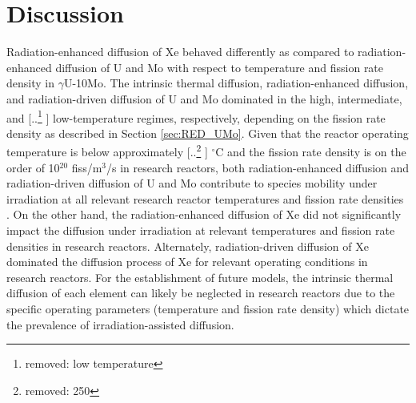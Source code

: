\documentclass[preprint,12pt]{elsarticle}
\providecommand{\DIFadd}[1]{{\protect\color{blue} \sf #1}} %
\providecommand{\DIFdel}[1]{{\protect\color{red} [..\footnote{removed: #1} ]}} %
\providecommand{\DIFaddbegin}{} %
\providecommand{\DIFaddend}{} %
\providecommand{\DIFdelbegin}{} %
\providecommand{\DIFdelend}{} %
\newcommand{\DIFscaledelfig}{0.5}
\newlength{\DIFdelgraphicswidth} %
\newlength{\DIFdelgraphicsheight} %
\newcommand{\DIFaddincludegraphics}[2][]{{\color{blue}\fbox{\DIFOincludegraphics[#1]{#2}}}} %
\newcommand{\DIFdelincludegraphics}[2][]{%
\sbox{\DIFdelgraphicsbox}{\DIFOincludegraphics[#1]{#2}}%
\settoboxwidth{\DIFdelgraphicswidth}{\DIFdelgraphicsbox} %
\settoboxtotalheight{\DIFdelgraphicsheight}{\DIFdelgraphicsbox} %
\scalebox{\DIFscaledelfig}{%
\parbox[b]{\DIFdelgraphicswidth}{\usebox{\DIFdelgraphicsbox}\\[-\baselineskip] \rule{\DIFdelgraphicswidth}{0em}}\llap{\resizebox{\DIFdelgraphicswidth}{\DIFdelgraphicsheight}{%
\setlength{\unitlength}{\DIFdelgraphicswidth}%
\begin{picture}(1,1)%
\thicklines\linethickness{2pt} %
{\color[rgb]{1,0,0}\put(0,0){\framebox(1,1){}}}%
{\color[rgb]{1,0,0}\put(0,0){\line( 1,1){1}}}%
{\color[rgb]{1,0,0}\put(0,1){\line(1,-1){1}}}%
\end{picture}%
}\hspace*{3pt}}} %
} %
\DeclareRobustCommand{\DIFaddbegin}{\DIFOaddbegin \let\includegraphics\DIFaddincludegraphics} %
\DeclareRobustCommand{\DIFaddend}{\DIFOaddend \let\includegraphics\DIFOincludegraphics} %
\DeclareRobustCommand{\DIFdelbegin}{\DIFOdelbegin \let\includegraphics\DIFdelincludegraphics} %
\DeclareRobustCommand{\DIFdelend}{\DIFOaddend \let\includegraphics\DIFOincludegraphics} %
\begin{document}
\FloatBarrier

\section{Discussion}
\label{sec:Discussion}
\indent Radiation-enhanced diffusion of Xe behaved differently as compared to radiation-enhanced diffusion of U and Mo with respect to temperature and fission rate density in $\gamma$U-10Mo. The intrinsic thermal diffusion, radiation-enhanced diffusion, and radiation-driven diffusion of U and Mo dominated in the high, intermediate, and \DIFdelbegin \DIFdel{low temperature }\DIFdelend \DIFaddbegin \DIFadd{low-temperature }\DIFaddend regimes, respectively, depending on the fission rate density as described in Section \ref{sec:RED_UMo}. Given that the reactor operating temperature is below approximately \DIFdelbegin \DIFdel{250}\DIFdelend \DIFaddbegin \DIFadd{150}\DIFaddend $^{\circ}$C and the fission rate density is on the order of 10$^{20}$ fiss/m$^{3}$/s in research reactors, both radiation-enhanced diffusion and radiation-driven diffusion of U and Mo contribute to species mobility under irradiation at all relevant research reactor temperatures and fission rate densities \cite{meyer2014irradiation, marshall2016new}. On the other hand, the radiation-enhanced diffusion of Xe did not significantly impact the diffusion under irradiation at relevant temperatures and fission rate densities in research reactors. Alternately, radiation-driven diffusion of Xe dominated the diffusion process of Xe for relevant operating conditions in research reactors. For the establishment of future models, the intrinsic thermal diffusion of each element can likely be neglected in research reactors due to the specific operating parameters (temperature and fission rate density) which dictate the prevalence of irradiation-assisted diffusion.
\DIFdelbegin %
\DIFdelend \DIFaddbegin 
\end{document}
